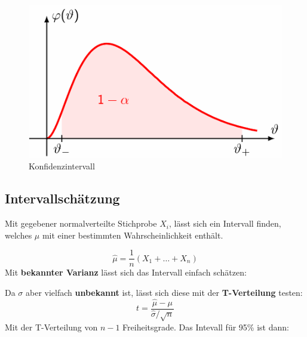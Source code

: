 \documentclass[../Main.tex]{subfiles}
\begin{document}
\begin{figure}[H]
    \centering
    \includegraphics[width=0.5\linewidth]{Images/konfidenzintervall.png}
    \caption{Konfidenzintervall}
\end{figure}



\subsection{Intervallschätzung}
Mit gegebener normalverteilte Stichprobe \(X_i\), lässt sich ein
Intervall finden, welches \(\mu\) mit einer bestimmten Wahrscheinlichkeit enthält.

\begin{equation}
    \hat{\mu} = \frac{1}{n}(X_1+\dots+X_n)
\end{equation} 
Mit \textbf{bekannter Varianz} lässt sich das Intervall einfach schätzen:
\begin{equation}
    [\hat{\mu}-1.96\frac{\sigma}{\sqrt{n}},\hat{\mu}+1.96\frac{\sigma}{\sqrt{n}}]
\end{equation}

Da \(\sigma\) aber vielfach \textbf{unbekannt} ist, lässt sich diese mit der \textbf{T-Verteilung} testen:
\begin{equation}
    t = \frac{\hat{\mu}-\mu}{\hat{\sigma}/\sqrt{n}}
\end{equation} 
Mit der T-Verteilung von \(n-1\) Freiheitsgrade. Das Intevall für 95\% ist dann:
\begin{equation}
    [\hat{\mu}+t_{-}\frac{\sigma}{\sqrt{n}},\hat{\mu}+t_{+}\frac{\sigma}{\sqrt{n}}]
\end{equation}

\end{document}

